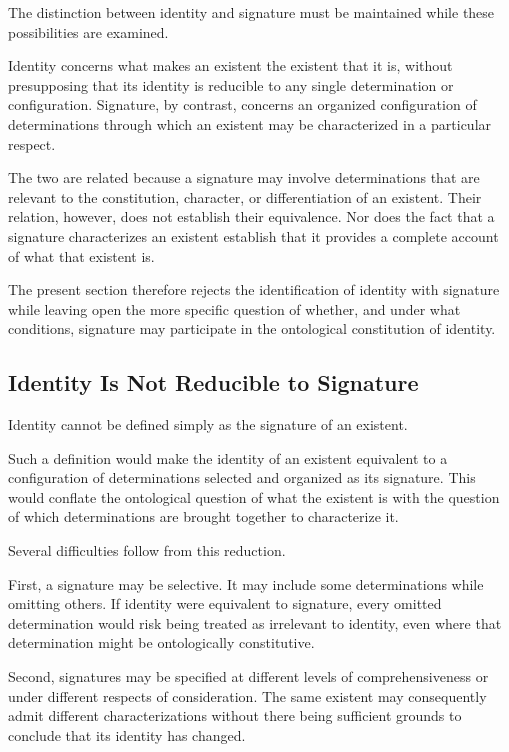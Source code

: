 The distinction between identity and signature must be
maintained while these possibilities are examined.

Identity concerns what makes an existent the existent that
it is, without presupposing that its identity is reducible
to any single determination or configuration. Signature,
by contrast, concerns an organized configuration of
determinations through which an existent may be characterized
in a particular respect.

The two are related because a signature may involve
determinations that are relevant to the constitution,
character, or differentiation of an existent. Their relation,
however, does not establish their equivalence. Nor does the
fact that a signature characterizes an existent establish
that it provides a complete account of what that existent
is.

The present section therefore rejects the identification
of identity with signature while leaving open the more
specific question of whether, and under what conditions,
signature may participate in the ontological constitution
of identity.

\subsection{Identity Is Not Reducible to Signature}

Identity cannot be defined simply as the signature of an
existent.

Such a definition would make the identity of an existent
equivalent to a configuration of determinations selected
and organized as its signature. This would conflate the
ontological question of what the existent is with the
question of which determinations are brought together
to characterize it.

Several difficulties follow from this reduction.

First, a signature may be selective. It may include some
determinations while omitting others. If identity were
equivalent to signature, every omitted determination
would risk being treated as irrelevant to identity, even
where that determination might be ontologically
constitutive.

Second, signatures may be specified at different levels
of comprehensiveness or under different respects of
consideration. The same existent may consequently admit
different characterizations without there being sufficient
grounds to conclude that its identity has changed.

